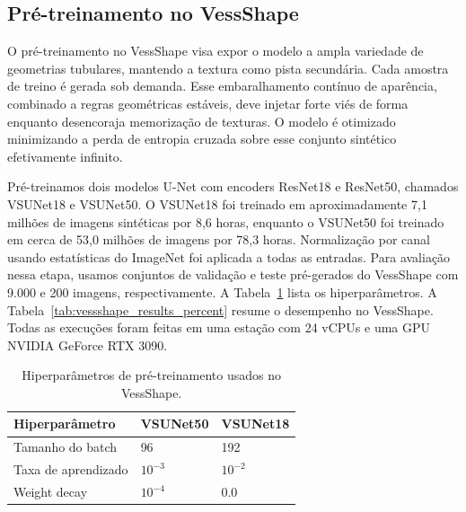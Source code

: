 \documentclass[%
reprint,
nofootinbib,
 amsmath,amssymb,
aps,
floatfix,
superscriptaddress,
showkeys,
longbibliography
]{revtex4-1}
\begin{document}
\subsection{Pré-treinamento no VessShape}

O pré-treinamento no VessShape visa expor o modelo a ampla variedade de geometrias tubulares, mantendo a textura como pista secundária. Cada amostra de treino é gerada sob demanda. Esse embaralhamento contínuo de aparência, combinado a regras geométricas estáveis, deve injetar forte viés de forma enquanto desencoraja memorização de texturas. O modelo é otimizado minimizando a perda de entropia cruzada sobre esse conjunto sintético efetivamente infinito. 

Pré-treinamos dois modelos U-Net com encoders ResNet18 e ResNet50, chamados VSUNet18 e VSUNet50. O VSUNet18 foi treinado em aproximadamente 7,1 milhões de imagens sintéticas por 8,6 horas, enquanto o VSUNet50 foi treinado em cerca de 53,0 milhões de imagens por 78,3 horas. Normalização por canal usando estatísticas do ImageNet foi aplicada a todas as entradas. Para avaliação nessa etapa, usamos conjuntos de validação e teste pré-gerados do VessShape com 9.000 e 200 imagens, respectivamente. A Tabela~\ref{tab:vs_hparams} lista os hiperparâmetros. A Tabela~\ref{tab:vessshape_results_percent} resume o desempenho no VessShape. Todas as execuções foram feitas em uma estação com 24 vCPUs e uma GPU NVIDIA GeForce RTX 3090.

\begin{table}[t]
    \caption{Hiperparâmetros de pré-treinamento usados no VessShape.}
    \label{tab:vs_hparams}
    \centering
    \begingroup
    \small
    \setlength{\tabcolsep}{6pt}
    \renewcommand{\arraystretch}{1.15}
    \begin{tabular}{l l l}
        \hline
        \textbf{Hiperparâmetro} & \textbf{VSUNet50} & \textbf{VSUNet18} \\
        \hline
        Tamanho do batch & 96 & 192 \\
        Taxa de aprendizado & $10^{-3}$ & $10^{-2}$ \\
        Weight decay & $10^{-4}$ & 0.0 \\
        \hline
    \end{tabular}
    \endgroup
\end{table}
\end{document}
